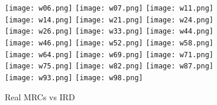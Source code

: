 \documentclass{article}
\begin{document}
\begin{figure}[!htb]
\centering
\texttt{[image: w06.png]}\hfill
\texttt{[image: w07.png]}\hfill
\texttt{[image: w11.png]}\\[2ex]
\texttt{[image: w14.png]}\hfill
\texttt{[image: w21.png]}\hfill
\texttt{[image: w24.png]}\\[2ex]
\texttt{[image: w26.png]}\hfill
\texttt{[image: w33.png]}\hfill
\texttt{[image: w44.png]}\\[2ex]
\texttt{[image: w46.png]}\hfill
\texttt{[image: w52.png]}\hfill
\texttt{[image: w58.png]}\\[2ex]
\texttt{[image: w64.png]}\hfill
\texttt{[image: w69.png]}\hfill
\texttt{[image: w71.png]}\\[2ex]
\texttt{[image: w75.png]}\hfill
\texttt{[image: w82.png]}\hfill
\texttt{[image: w87.png]}\\[2ex]
\texttt{[image: w93.png]}\hfill
\texttt{[image: w98.png]}
\caption{Real MRCs vs IRD}
\end{figure}
\end{document}
